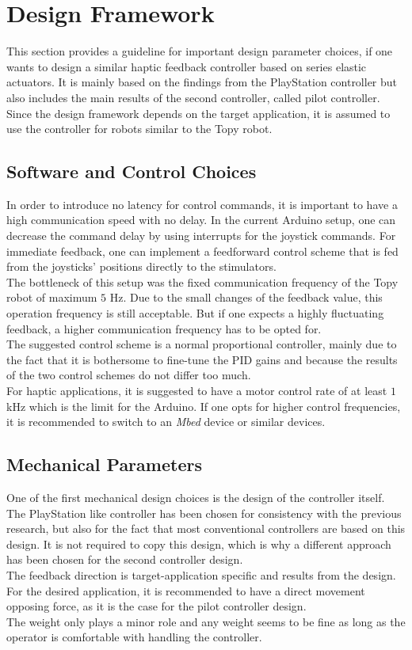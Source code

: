 \section{Design Framework}
This section provides a guideline for important design parameter choices, if one wants to design a similar haptic feedback controller based on series elastic actuators. It is mainly based on the findings from the PlayStation controller but also includes the main results of the second controller, called pilot controller. \\
Since the design framework depends on the target application, it is assumed to use the controller for robots similar to the Topy robot.

\subsection{Software and Control Choices}
In order to introduce no latency for control commands, it is important to have a high communication speed with no delay. In the current Arduino setup, one can decrease the command delay by using interrupts for the joystick commands. For immediate feedback, one can implement a feedforward control scheme that is fed from the joysticks' positions directly to the stimulators.\\
The bottleneck of this setup was the fixed communication frequency of the Topy robot of maximum $5$ Hz. Due to the small changes of the feedback value, this operation frequency is still acceptable. But if one expects a highly fluctuating feedback, a higher communication frequency has to be opted for.\\
The suggested control scheme is a normal proportional controller, mainly due to the fact that it is bothersome to fine-tune the PID gains and because the results of the two control schemes do not differ too much.\\
For haptic applications, it is suggested to have a motor control rate of at least $1$kHz which is the limit for the Arduino. If one opts for higher control frequencies, it is recommended to switch to an \textit{Mbed} device or similar devices.

\subsection{Mechanical Parameters}
One of the first mechanical design choices is the design of the controller itself. The PlayStation like controller has been chosen for consistency with the previous research, but also for the fact that most conventional controllers are based on this design. It is not required to copy this design, which is why a different approach has been chosen for the second controller design.\\
The feedback direction is target-application specific and results from the design. For the desired application, it is recommended to have a direct movement opposing force, as it is the case for the pilot controller design.\\
The weight only plays a minor role and any weight seems to be fine as long as the operator is comfortable with handling the controller.\\

